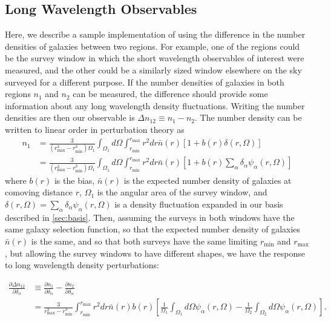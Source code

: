 \documentclass[a4paper,11pt]{article}
\begin{document}
\subsection{Long Wavelength Observables}
\label{ssec:lw_observables}
Here, we describe a sample implementation of using the difference in the number densities of galaxies between two regions. For example, one of the regions could be the survey window in which the short wavelength observables of interest were measured, and the other could be a similarly sized window elsewhere on the sky surveyed for a different purpose. If the number densities of galaxies in both regions $n_1$ and $n_2$ can be measured, the difference should provide some information about any long wavelength density fluctuations. Writing the number densities are  then our observable is $\Delta n_{12}\equiv n_1-n_2$.  The number density can be written to linear order in perturbation theory as
\begin{align}\label{number_density}
n_1 &= \frac{3}{(r_\text{max}^3-r_\text{min}^3)\Omega_1}\int_{\Omega_1}d\Omega\int_{r_\text{min}}^{r_\text{max}}r^2 dr \bar{n}(r)\left[1+b(r)\delta(r,\Omega)\right]\\
&= \frac{3}{(r_\text{max}^3-r_\text{min}^3)\Omega_1}\int_{\Omega_1}d\Omega\int_{r_\text{min}}^{r_\text{max}}r^2 dr \bar{n}(r)\left[1+b(r)\sum_\alpha{\delta_\alpha\psi_\alpha(r,\Omega)}\right]
\end{align}
where $b(r)$ is the bias, $\bar{n}(r)$ is the expected number density of galaxies at comoving distance $r$, $\Omega_1$ is the angular area of the survey window, and $\delta(r,\Omega)=\sum_\alpha{\delta_\alpha\psi_\alpha(r,\Omega)}$ is a density fluctuation expanded in our basis described in \ref{sec:basis}.
Then, assuming the surveys in both windows have the same galaxy selection function, so that the expected number density of galaxies $\bar{n}(r)$ is the same, and so that both surveys have the same limiting $r_\text{min}$ and $r_\text{max}$, but allowing the survey windows to have different shapes, we have the response to long wavelength density perturbations:

\begin{align}\label{number_density_response}
\frac{\partial \Delta n_{12}}{\partial \delta_\alpha}&\equiv \frac{\partial n_1}{\partial \delta_\alpha}-\frac{\partial n_2}{\partial \delta_\alpha} \\
&=  \frac{3}{r_\text{max}^3-r_\text{min}^3}\int_{r_\text{min}}^{r_\text{max}}r^2 dr \bar{n}(r)b(r)\left[\frac{1}{\Omega_1}\int_{\Omega_1}d\Omega \psi_{\alpha}(r,\Omega)-\frac{1}{\Omega_2}\int_{\Omega_2}d\Omega\psi_{\alpha}(r,\Omega)\right].
\end{align}
\end{document}
